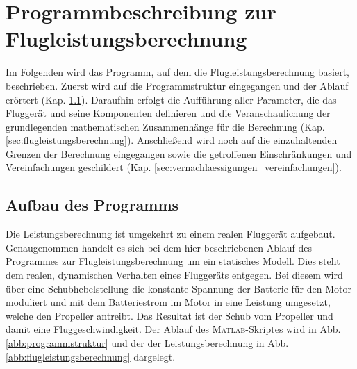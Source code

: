 \chapter{Programmbeschreibung zur Flugleistungsberechnung}
\label{chap:Programmbeschreibung}
Im Folgenden wird das Programm, auf dem die Flugleistungsberechnung basiert, beschrieben. Zuerst wird auf die Programmstruktur eingegangen und der Ablauf erörtert (Kap. \ref{sec:aufbau_des_programms}). Daraufhin erfolgt die Aufführung aller Parameter, die das Fluggerät und seine Komponenten definieren und die Veranschaulichung der grundlegenden mathematischen Zusammenhänge für die Berechnung (Kap. \ref{sec:flugleistungsberechnung}). Anschließend wird noch auf die einzuhaltenden Grenzen der Berechnung eingegangen sowie die getroffenen Einschränkungen und Vereinfachungen geschildert (Kap. \ref{sec:vernachlaessigungen_vereinfachungen}).

\section{Aufbau des Programms}
\label{sec:aufbau_des_programms}
Die Leistungsberechnung ist umgekehrt zu einem realen Fluggerät aufgebaut.  Genaugenommen handelt es sich bei dem hier beschriebenen Ablauf des Programmes zur Flugleistungsberechnung um ein statisches Modell. Dies steht dem realen, dynamischen Verhalten eines Fluggeräts entgegen. Bei diesem wird über eine Schubhebelstellung die konstante Spannung der Batterie für den Motor moduliert und mit dem Batteriestrom im Motor in eine Leistung umgesetzt, welche den Propeller antreibt. Das Resultat ist der Schub vom Propeller und damit eine Fluggeschwindigkeit.
Der Ablauf des \textsc{Matlab}-Skriptes wird in Abb. \ref{abb:programmstruktur} und der der Leistungsberechnung in Abb. \ref{abb:flugleistungsberechnung} dargelegt.


